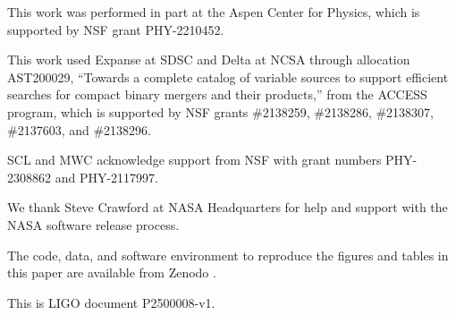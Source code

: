 \documentclass[twocolumn,times]{aastex631}
\begin{document}
\begin{acknowledgments}
This work was performed in part at the Aspen Center for Physics, which is supported by \ac{NSF} grant PHY-2210452.

This work used Expanse at \ac{SDSC} and Delta at \ac{NCSA} through allocation AST200029, ``Towards a complete catalog of variable sources to support efficient searches for compact binary mergers and their products,'' from the \ac{ACCESS} program, which is supported by \ac{NSF} grants \#2138259, \#2138286, \#2138307, \#2137603, and \#2138296.

SCL and MWC acknowledge support from \ac{NSF} with grant numbers PHY-2308862 and PHY-2117997.

We thank Steve Crawford at NASA Headquarters for help and support with the NASA software release process.

The code, data, and software environment to reproduce the figures and tables in this paper are available from Zenodo \citep{singer_2025_14825979}.

This is LIGO document P2500008-v1.
\end{acknowledgments}

\vspace{5mm}

{}

\end{document}
